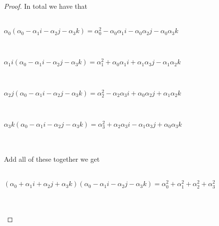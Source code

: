 \documentclass[12pt]{article}
\begin{document}
\begin{proof} 
In total we have that \\ \\
\centerline{$\alpha_0(\alpha_0 - \alpha_1i -\alpha_2j -\alpha_3k) = \alpha_0^2-\alpha_0\alpha_1i-\alpha_0\alpha_2j-\alpha_0\alpha_3k$} \\
\centerline{$\alpha_1i(\alpha_0 - \alpha_1i -\alpha_2j -\alpha_3k) = \alpha_1^2+\alpha_0\alpha_1i+\alpha_1\alpha_3j-\alpha_1\alpha_2k$} \\
\centerline{$\alpha_2j(\alpha_0 - \alpha_1i -\alpha_2j -\alpha_3k) = \alpha_2^2-\alpha_2\alpha_3i+\alpha_0\alpha_2j+\alpha_1\alpha_2k$} \\
\centerline{$\alpha_3k(\alpha_0 - \alpha_1i -\alpha_2j -\alpha_3k) = \alpha_3^2+\alpha_2\alpha_3i-\alpha_1\alpha_3j+\alpha_0\alpha_3k$} \\ \\ 
Add all of these together we get \\ \\
\centerline{$(\alpha_0 + \alpha_1i +\alpha_2j +\alpha_3k)(\alpha_0 - \alpha_1i -\alpha_2j -\alpha_3k) = \alpha^2_0+\alpha^2_1+\alpha^2_2+\alpha^2_3$} \\ \\
\end{proof}



\end{document}

